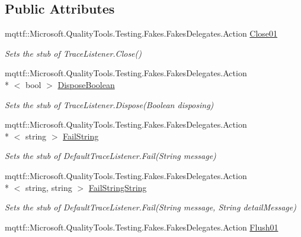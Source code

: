 \subsection*{Public Attributes}
\begin{DoxyCompactItemize}
\item 
mqttf\-::\-Microsoft.\-Quality\-Tools.\-Testing.\-Fakes.\-Fakes\-Delegates.\-Action \hyperlink{class_system_1_1_diagnostics_1_1_fakes_1_1_stub_default_trace_listener_a8eef0b8f151da2c018f48c2c600953d5}{Close01}
\begin{DoxyCompactList}\small\item\em Sets the stub of Trace\-Listener.\-Close()\end{DoxyCompactList}\item 
mqttf\-::\-Microsoft.\-Quality\-Tools.\-Testing.\-Fakes.\-Fakes\-Delegates.\-Action\\*
$<$ bool $>$ \hyperlink{class_system_1_1_diagnostics_1_1_fakes_1_1_stub_default_trace_listener_a1b780dd59bddb56ae6e2808b9412dcd4}{Dispose\-Boolean}
\begin{DoxyCompactList}\small\item\em Sets the stub of Trace\-Listener.\-Dispose(\-Boolean disposing)\end{DoxyCompactList}\item 
mqttf\-::\-Microsoft.\-Quality\-Tools.\-Testing.\-Fakes.\-Fakes\-Delegates.\-Action\\*
$<$ string $>$ \hyperlink{class_system_1_1_diagnostics_1_1_fakes_1_1_stub_default_trace_listener_adf46726a603d09eff04125a0a950d622}{Fail\-String}
\begin{DoxyCompactList}\small\item\em Sets the stub of Default\-Trace\-Listener.\-Fail(\-String message)\end{DoxyCompactList}\item 
mqttf\-::\-Microsoft.\-Quality\-Tools.\-Testing.\-Fakes.\-Fakes\-Delegates.\-Action\\*
$<$ string, string $>$ \hyperlink{class_system_1_1_diagnostics_1_1_fakes_1_1_stub_default_trace_listener_ab8b66fe93d7f020820e2f8530dee3dee}{Fail\-String\-String}
\begin{DoxyCompactList}\small\item\em Sets the stub of Default\-Trace\-Listener.\-Fail(\-String message, String detail\-Message)\end{DoxyCompactList}\item 
mqttf\-::\-Microsoft.\-Quality\-Tools.\-Testing.\-Fakes.\-Fakes\-Delegates.\-Action \hyperlink{class_system_1_1_diagnostics_1_1_fakes_1_1_stub_default_trace_listener_a87d53eb2b30049b967fb396eb2ac484d}{Flush01}

\end{DoxyCompactItemize}
